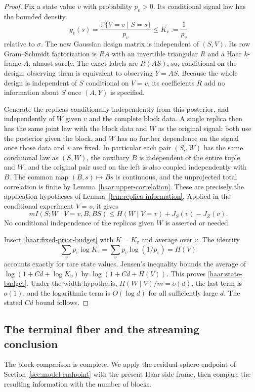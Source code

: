 \begin{proof}
Fix a state value $v$ with probability $p_v>0$.  Its conditional signal
law has the bounded density
\[
 g_v(s)=\frac{\mathbb P\{V=v\mid S=s\}}{p_v}\le K_v:=\frac1{p_v}
\]
relative to $\sigma$.  The new Gaussian design matrix is independent of
$(S,V)$.  Its row Gram--Schmidt factorization is $RA$ with an invertible
triangular $R$ and a Haar $k$-frame $A$, almost surely.  The exact labels
are $R(AS)$, so, conditional on the design, observing them is equivalent
to observing $Y=AS$.  Because the whole design is independent of $S$
conditional on $V=v$, its coefficients $R$ add no information about $S$
once $(A,Y)$ is specified.

Generate the replicas conditionally independently from this posterior,
and independently of $W$ given $v$ and the complete block data.  A single
replica then has the same joint law with the block data and $W$ as the
original signal: both use the posterior given the block, and $W$ has no
further dependence on the signal once those data and $v$ are fixed.
In particular each pair $(S_i,W)$ has the same conditional law as
$(S,W)$, the auxiliary $B$ is independent of the entire tuple and $W$,
and the original pair used on the left is also coupled independently
with $B$.  The common map $(B,s)\mapsto Bs$ is continuous, and the
unprojected total correlation is finite by
Lemma~\ref{haar:upper-correlation}.  These are precisely the application
hypotheses of Lemma~\ref{lem:replica-information}.  Applied in the
conditional experiment $V=v$, it gives
\[
 mI(S;W\mid V=v,B,BS)
 \le H(W\mid V=v)+J_S(v)-J_Z(v).
\]
No conditional independence of the replicas given $W$ is asserted or
needed.

Insert \eqref{haar:fixed-prior-budget} with $K=K_v$ and average over $v$.
The identity
\[
 \sum_v p_v\log K_v=\sum_vp_v\log(1/p_v)=H(V)
\]
accounts exactly for rare state values.  Jensen's inequality bounds the
average of $\log(1+Cd+\log K_v)$ by $\log(1+Cd+H(V))$.  This proves
\eqref{haar:state-budget}.  Under the width hypothesis,
$H(W\mid V)/m=o(d)$, the last term is $o(1)$, and the logarithmic term
is $O(\log d)$ for all sufficiently large $d$.  The stated $Cd$ bound
follows.
\end{proof}

\subsection{The terminal fiber and the streaming conclusion}

The block comparison is complete.  We apply the residual-sphere endpoint
of Section~\ref{sec:model-endpoint} with the present Haar side frame,
then compare the resulting information with the number of blocks.

